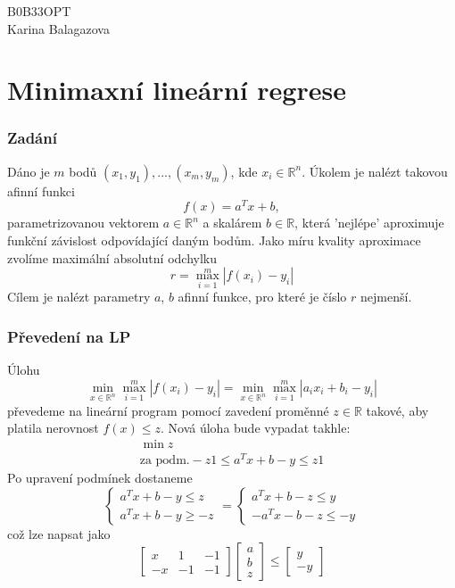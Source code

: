 \documentclass[11pt]{article}
\begin{document}
\begin{flushright}
B0B33OPT\\
Karina Balagazova
\end{flushright}
\part*{Minimaxní lineární regrese}

\section{Zadání}
Dáno je $m$ bodů $(x_{1}, y_{1}),...,(x_{m}, y_{m})$, kde $x_{i} \in \mathbb{R}^{n}$. Úkolem je nalézt takovou afinní funkci
$$f(x) = a^{T}x + b,$$
parametrizovanou vektorem $a \in \mathbb{R}^{n}$ a skalárem $b \in \mathbb{R}$, která 'nejlépe' aproximuje funkční závislost odpovídající daným bodům.
Jako míru kvality aproximace zvolíme maximální absolutní odchylku
$$r = \max_{i = 1}^{m} |f(x_{i}) - y_{i}|$$
Cílem je nalézt parametry $a$, $b$ afinní funkce, pro které je číslo $r$ nejmenší.

\section{Převedení na LP}

Úlohu 
$$\min_{x \in \mathbb{R}^{n}} \max_{i = 1}^{m} |f(x_{i}) - y_{i}| = 
\min_{x \in \mathbb{R}^{n}} \max_{i = 1}^{m} |a_{i}x_{i} + b_{i} - y_{i}|$$
převedeme na lineární program pomocí zavedení proměnné $z \in \mathbb{R}$ takové, aby platila nerovnost $f(x) \leq z$. Nová úloha bude vypadat takhle:
$$
\begin{array}{lcl} 
\min z \\ 
\textrm{za podm.} -z1 \leq a^{T}x + b - y \leq z1
\end{array}
$$
Po upravení podmínek dostaneme
$$
\begin{cases}
 a^{T}x + b - y \leq z \\ 
 a^{T}x + b - y \geq -z
\end{cases}
=
\begin{cases}
 a^{T}x + b - z \leq y \\ 
 -a^{T}x - b - z \leq -y
\end{cases}
$$
což lze napsat jako
$$
	\begin{bmatrix} x & 1 & -1 \\ -x & -1 & -1 \end{bmatrix}
	\begin{bmatrix} a\\ b\\ z \end{bmatrix}
	\leq
	\begin{bmatrix} y\\ -y \end{bmatrix}
$$
\end{document}

